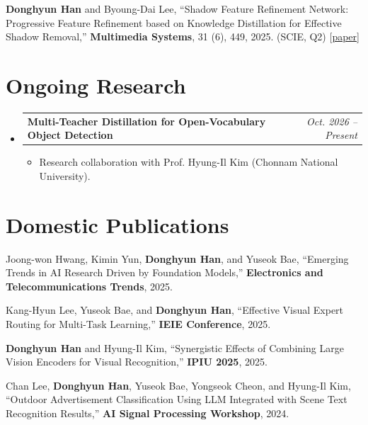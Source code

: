 \documentclass[a4paper,11pt]{article}
\makeatletter
\newcommand{\resumePOR}[3]{
\vspace{0.5mm}\item
    \begin{tabular*}{0.97\textwidth}[t]{l@{\extracolsep{\fill}}r}
        \textbf{#1}\hspace{0.3mm}#2 & \textit{\small{#3}}
    \end{tabular*}
    \vspace{-2mm}
}
\newcommand{\resumeSubHeadingListStart}{\begin{itemize}[leftmargin=*,labelsep=1mm]}
\newcommand{\resumeItemListStart}{\begin{itemize}[leftmargin=*,labelsep=1mm,itemsep=0.5mm]}
\newcommand{\resumeSubHeadingListEnd}{\end{itemize}\vspace{2mm}}
\newcommand{\resumeItemListEnd}{\end{itemize}\vspace{-2mm}}
\makeatother
\begin{document}
\vspace{3mm}
\noindent
\textbf{Donghyun Han} and Byoung-Dai Lee,
``Shadow Feature Refinement Network: Progressive Feature Refinement based on Knowledge Distillation for Effective Shadow Removal,''
\textbf{Multimedia Systems}, 31 (6), 449, 2025. (SCIE, Q2)
[\href{https://doi.org/10.1007/s00530-025-02036-5}{paper}]


\section{\textbf{Ongoing Research}}
\vspace{-0.4mm}
  \resumeSubHeadingListStart
  \resumePOR
    {Multi-Teacher Distillation for Open-Vocabulary Object Detection}{}
    {Oct. 2026 -- Present}
    \resumeItemListStart
        \item Research collaboration with Prof. Hyung-Il Kim (Chonnam National University).
    \resumeItemListEnd
  \resumeSubHeadingListEnd
\vspace{-4mm}

\section{\textbf{Domestic Publications}}

\noindent
Joong-won Hwang, Kimin Yun, \textbf{Donghyun Han}, and Yuseok Bae,
``Emerging Trends in AI Research Driven by Foundation Models,''
\textbf{Electronics and Telecommunications Trends}, 2025.

\vspace{2mm}

\noindent
Kang-Hyun Lee, Yuseok Bae, and \textbf{Donghyun Han},
``Effective Visual Expert Routing for Multi-Task Learning,''
\textbf{IEIE Conference}, 2025.

\vspace{2mm}

\noindent
\textbf{Donghyun Han} and Hyung-Il Kim,
``Synergistic Effects of Combining Large Vision Encoders for Visual Recognition,''
\textbf{IPIU 2025}, 2025.

\vspace{2mm}

\noindent
Chan Lee, \textbf{Donghyun Han}, Yuseok Bae, Yongseok Cheon, and Hyung-Il Kim,
``Outdoor Advertisement Classification Using LLM Integrated with Scene Text Recognition Results,''
\textbf{AI Signal Processing Workshop}, 2024.
\end{document}
